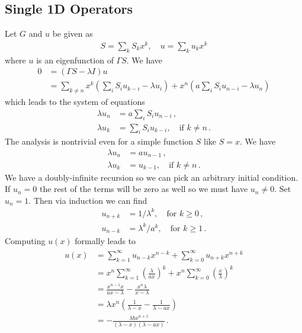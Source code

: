 \subsection{Single 1D Operators}
Let $G$ and $u$ be given as
\begin{align}
	S = \sum_k S_k x^k,\quad u = \sum_k u_k x^k
\end{align}
where $u$ is an eigenfunction of $\Gamma S$. We have
\begin{align}
	0&=(\Gamma S-\lambda I) u \\
	&= \sum_{k\neq n} x^k \left(\sum_i S_i u_{k-i} - \lambda u_i\right) + x^n \left(a\sum_i S_i u_{n-i} -\lambda u_n\right)
\end{align}
which leads to the system of equations
\begin{align}
	\lambda u_n &= a\sum_i S_i u_{n-i}\,,\\
	\lambda u_k &= \sum_i S_i u_{k-i}, \quad \text{if } k \neq n\,.
\end{align}
The analysis is nontrivial even for a simple function $S$ like $S = x$. We have
\begin{align}
	\lambda u_n &= a u_{n-1}\,,\\
	\lambda u_k &= u_{k-1}, \quad \text{if } k \neq n\,.
\end{align}
We have a doubly-infinite recursion so we can pick an arbitrary initial condition. If $u_n = 0$ the rest of the terms will be zero as well so we must have $u_n \neq 0$. Set $u_n = 1$. Then via induction we can find
\begin{align}
	u_{n+k} &= 1/\lambda^{k}, \quad \text{for $k \ge 0$}\,,\\
	u_{n-k} &= \lambda^{k}/a^k, \quad \text{for $k \ge 1$}\,.
\end{align}
Computing $u(x)$ formally leads to
\begin{align}\begin{split}
	u(x) &=  \sum_{k=1}^{\infty} u_{n-k}x^{n-k}+\sum_{k=0}^{\infty} u_{n+k}x^{n+k}\\
	        &= x^n\sum_{k=1}^{\infty}\left(\frac{\lambda}{ax}\right)^k +  x^n\sum_{k=0}^{\infty} \left(\frac{x}{\lambda}\right)^k\\
	        &= \frac{x^{n-1}x}{ax-\lambda}-\frac{x^n\lambda}{x-\lambda}\\
	        &=\lambda x^n\left(\frac{1}{\lambda -x}- \frac{1}{\lambda - ax}\right)\\
	        &=-\frac{\lambda b x^{n+1}}{(\lambda-x)(\lambda-ax)}\,.
\end{split}\end{align}
